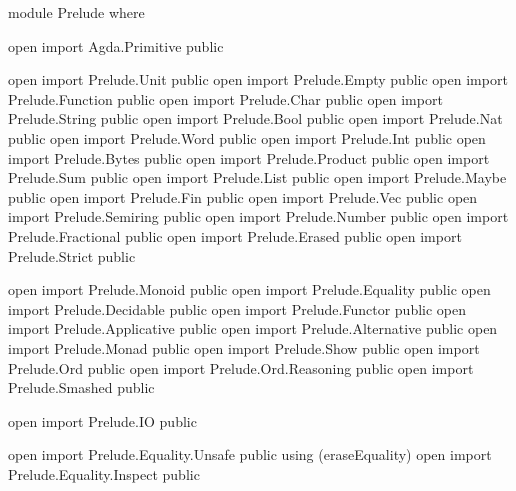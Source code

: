 
module Prelude where

open import Agda.Primitive      public

open import Prelude.Unit        public
open import Prelude.Empty       public
open import Prelude.Function    public
open import Prelude.Char        public
open import Prelude.String      public
open import Prelude.Bool        public
open import Prelude.Nat         public
open import Prelude.Word        public
open import Prelude.Int         public
open import Prelude.Bytes       public
open import Prelude.Product     public
open import Prelude.Sum         public
open import Prelude.List        public
open import Prelude.Maybe       public
open import Prelude.Fin         public
open import Prelude.Vec         public
open import Prelude.Semiring    public
open import Prelude.Number      public
open import Prelude.Fractional  public
open import Prelude.Erased      public
open import Prelude.Strict      public

open import Prelude.Monoid      public
open import Prelude.Equality    public
open import Prelude.Decidable   public
open import Prelude.Functor     public
open import Prelude.Applicative public
open import Prelude.Alternative public
open import Prelude.Monad       public
open import Prelude.Show        public
open import Prelude.Ord         public
open import Prelude.Ord.Reasoning public
open import Prelude.Smashed     public

open import Prelude.IO          public

open import Prelude.Equality.Unsafe  public using (eraseEquality)
open import Prelude.Equality.Inspect public
